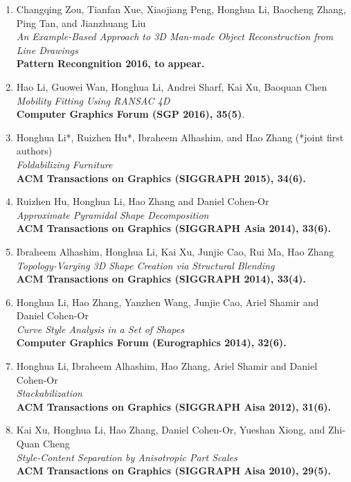 \documentclass[10pt]{article}
\begin{document}
	\begin{enumerate}
		\item Changqing Zou, Tianfan Xue, Xiaojiang Peng, Honghua Li, Baocheng Zhang, Ping Tan, and Jianzhuang Liu\\
		\textit{An Example-Based Approach to 3D Man-made Object Reconstruction from Line Drawings}\\
		\textbf{Pattern Recongnition 2016, to appear.}
	
		\item Hao Li, Guowei Wan, Honghua Li, Andrei Sharf, Kai Xu, Baoquan Chen\\
		\textit{Mobility Fitting Using RANSAC 4D}\\
		\textbf{Computer Graphics Forum (SGP 2016), 35(5)}.
		
		\item Honghua Li*, Ruizhen Hu*, Ibraheem Alhashim, and Hao Zhang (*joint first authors) \\ \textit{Foldabilizing Furniture} \\
		\textbf{ACM Transactions on Graphics (SIGGRAPH 2015), 34(6).}
		
		\item Ruizhen Hu, Honghua Li, Hao Zhang and Daniel Cohen-Or\\ \textit{Approximate Pyramidal Shape	Decomposition} \\
		\textbf{ACM Transactions on Graphics (SIGGRAPH Asia 2014), 33(6).}
		
		\item Ibraheem Alhashim, Honghua Li, Kai Xu, Junjie Cao, Rui Ma, Hao Zhang \\
		\textit{Topology-Varying 3D Shape Creation via Structural Blending} \\
		\textbf{ACM Transactions on Graphics (SIGGRAPH 2014), 33(4).}
		
		\item Honghua Li, Hao Zhang, Yanzhen Wang, Junjie Cao, Ariel Shamir and Daniel Cohen-Or\\
		\textit{Curve Style Analysis in a Set of Shapes}\\
		\textbf{Computer Graphics Forum (Eurographics 2014), 32(6).}
		
		\item Honghua Li, Ibraheem Alhashim, Hao Zhang, Ariel Shamir and Daniel Cohen-Or\\
		\textit{Stackabilization}\\
		\textbf{ACM Transactions on Graphics (SIGGRAPH Aisa 2012), 31(6).}
		
		\item Kai Xu, Honghua Li, Hao Zhang, Daniel Cohen-Or, Yueshan Xiong, and Zhi-Quan Cheng\\
		\textit{Style-Content Separation by Anisotropic Part Scales}\\
		\textbf{ACM Transactions on Graphics (SIGGRAPH Aisa 2010), 29(5).}	
	\end{enumerate}
\end{document}
